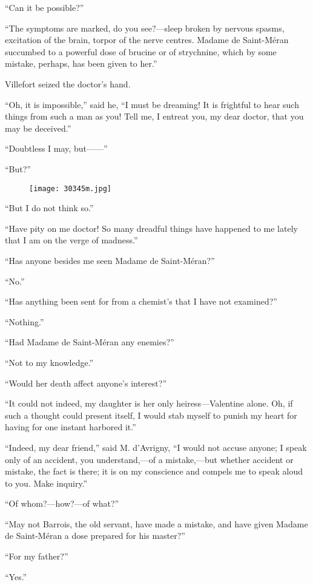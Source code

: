 “Can it be possible?”

“The symptoms are marked, do you see?—sleep broken by nervous spasms,
excitation of the brain, torpor of the nerve centres. Madame de
Saint-Méran succumbed to a powerful dose of brucine or of strychnine,
which by some mistake, perhaps, has been given to her.”

Villefort seized the doctor’s hand.

“Oh, it is impossible,” said he, “I must be dreaming! It is frightful
to hear such things from such a man as you! Tell me, I entreat you, my
dear doctor, that you may be deceived.”

“Doubtless I may, but——”

“But?”

\begin{figure}[ht]
\texttt{[image: 30345m.jpg]}
\end{figure}

“But I do not think so.”

“Have pity on me doctor! So many dreadful things have happened to me
lately that I am on the verge of madness.”

“Has anyone besides me seen Madame de Saint-Méran?”

“No.”

“Has anything been sent for from a chemist’s that I have not examined?”

“Nothing.”

“Had Madame de Saint-Méran any enemies?”

“Not to my knowledge.”

“Would her death affect anyone’s interest?”

“It could not indeed, my daughter is her only heiress—Valentine alone.
Oh, if such a thought could present itself, I would stab myself to
punish my heart for having for one instant harbored it.”

“Indeed, my dear friend,” said M. d’Avrigny, “I would not accuse
anyone; I speak only of an accident, you understand,—of a mistake,—but
whether accident or mistake, the fact is there; it is on my conscience
and compels me to speak aloud to you. Make inquiry.”

“Of whom?—how?—of what?”

“May not Barrois, the old servant, have made a mistake, and have given
Madame de Saint-Méran a dose prepared for his master?”

“For my father?”

“Yes.”

